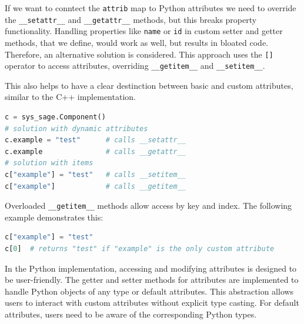 If we want to conntect the \verb|attrib| map to Python attributes we need to override the \verb|__setattr__| and \verb|__getattr__| methods, but this breaks property functionality. Handling properties like \verb|name| or \verb|id| in custom setter and getter methods, that we define, would work as well, but results in bloated code. Therefore, an alternative solution is considered. This approach uses the \verb|[]| operator to access attributes, overriding \verb|__getitem__| and \verb|__setitem__|.\cite[see Reference/Convenience classes for arbitrary Python Types]{pybind11-docu}\cite{python-getitem}

This also helps to have a clear destinction between basic and custom attributes, similar to the C++ implementation.

\begin{lstlisting}[language=Python, xleftmargin=4em, frame = single]
c = sys_sage.Component()
# solution with dynamic attributes
c.example = "test"      # calls __setattr__
c.example               # calls __getattr__
# solution with items
c["example"] = "test"   # calls __setitem__
c["example"]            # calls __getitem__
\end{lstlisting}




Overloaded \verb|__getitem__| methods allow access by key and index. The following example demonstrates this:

\begin{lstlisting}[language=Python, xleftmargin=4em, frame = single]
c["example"] = "test"
c[0]  # returns "test" if "example" is the only custom attribute
\end{lstlisting}
In the Python implementation, accessing and modifying attributes is designed to be user-friendly. The getter and setter methods for attributes are implemented to handle Python objects of any type or default attributes. This abstraction allows users to interact with custom attributes without explicit type casting. For default attributes, users need to be aware of the corresponding Python types.

